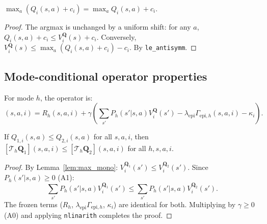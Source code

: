 \begin{lemma}
\label{lem:max_const}
$\max_a (Q_i(s,a) + c_i) = \max_a Q_i(s,a) + c_i$.
\end{lemma}
\begin{proof}
The argmax is unchanged by a uniform shift: for any $a$, $Q_i(s,a) + c_i \le V_i^{\mathbf{Q}}(s) + c_i$.  Conversely, $V_i^{\mathbf{Q}}(s) \le \max_a(Q_i(s,a) + c_i) - c_i$.  By \texttt{le\_antisymm}.
\end{proof}

\subsection{Mode-conditional operator properties}

\begin{definition}
For mode $h$, the operator is:
\begin{equation}
    [\mathcal{T}_h \mathbf{Q}](s,a,i) = R_h(s,a,i) + \gamma \left( \sum_{s'} P_h(s'|s,a) V_i^{\mathbf{Q}}(s') - \lambda_{\mathrm{epi}} \Gamma_{\mathrm{epi},h}(s,a,i) - \kappa_i \right).
\end{equation}
\end{definition}

\begin{lemma}
\label{lem:mode_mono}
If $Q_{1,i}(s,a) \le Q_{2,i}(s,a)$ for all $s,a,i$, then $[\mathcal{T}_h \mathbf{Q}_1](s,a,i) \le [\mathcal{T}_h \mathbf{Q}_2](s,a,i)$ for all $h,s,a,i$.
\end{lemma}
\begin{proof}
By Lemma~\ref{lem:max_mono}: $V_i^{\mathbf{Q}_1}(s') \le V_i^{\mathbf{Q}_2}(s')$.  Since $P_h(s'|s,a) \ge 0$ (A1):
\begin{equation}
    \sum_{s'} P_h(s'|s,a) V_i^{\mathbf{Q}_1}(s') \le \sum_{s'} P_h(s'|s,a) V_i^{\mathbf{Q}_2}(s').
\end{equation}
The frozen terms ($R_h$, $\lambda_{\mathrm{epi}}\Gamma_{\mathrm{epi},h}$, $\kappa_i$) are identical for both.  Multiplying by $\gamma \ge 0$ (A0) and applying \texttt{nlinarith} completes the proof.
\end{proof}


